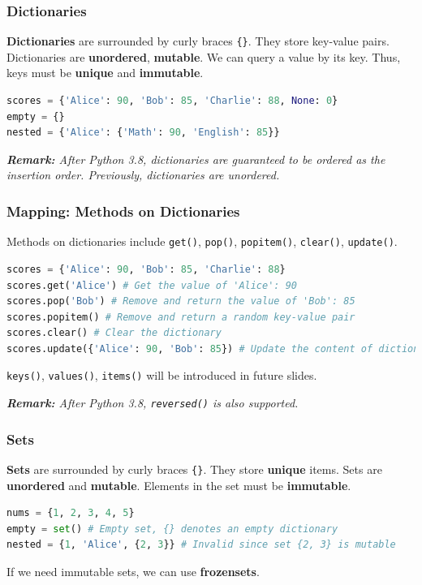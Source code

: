 \documentclass[beamer, en, version=2.0]{huangfusl-template}
\begin{document}
    \begin{frame}[fragile]
        \frametitle{Dictionaries}

        \textbf{Dictionaries} are surrounded by curly braces {\footnotesize\verb|{}|}. They store key-value pairs. Dictionaries are \textbf{unordered}, \textbf{mutable}. We can query a value by its key. Thus, keys must be \textbf{unique} and \textbf{immutable}.

\begin{lstlisting}[language=python]
scores = {'Alice': 90, 'Bob': 85, 'Charlie': 88, None: 0}
empty = {}
nested = {'Alice': {'Math': 90, 'English': 85}}
\end{lstlisting}

        {\footnotesize\itshape\textbf{Remark:} After Python 3.8, dictionaries are guaranteed to be ordered as the insertion order. Previously, dictionaries are unordered.}
    \end{frame}
    \begin{frame}[fragile]
        \frametitle{Mapping: Methods on Dictionaries}

        Methods on dictionaries include {\footnotesize\verb|get()|}, {\footnotesize\verb|pop()|}, {\footnotesize\verb|popitem()|}, {\footnotesize\verb|clear()|}, {\footnotesize\verb|update()|}.

\begin{lstlisting}[language=python]
scores = {'Alice': 90, 'Bob': 85, 'Charlie': 88}
scores.get('Alice') # Get the value of 'Alice': 90
scores.pop('Bob') # Remove and return the value of 'Bob': 85
scores.popitem() # Remove and return a random key-value pair
scores.clear() # Clear the dictionary
scores.update({'Alice': 90, 'Bob': 85}) # Update the content of dictionary
\end{lstlisting}

        {\footnotesize\verb|keys()|}, {\footnotesize\verb|values()|}, {\footnotesize\verb|items()|} will be introduced in future slides.

        {\footnotesize\itshape\textbf{Remark:} After Python 3.8, \verb|reversed()| is also supported.}
    \end{frame}
    \begin{frame}[fragile]
        \frametitle{Sets}

        \textbf{Sets} are surrounded by curly braces {\footnotesize\verb|{}|}. They store \textbf{unique} items. Sets are \textbf{unordered} and \textbf{mutable}. Elements in the set must be \textbf{immutable}.

\begin{lstlisting}[language=python]
nums = {1, 2, 3, 4, 5}
empty = set() # Empty set, {} denotes an empty dictionary
nested = {1, 'Alice', {2, 3}} # Invalid since set {2, 3} is mutable
\end{lstlisting}

        If we need immutable sets, we can use \textbf{frozensets}.
    \end{frame}
\end{document}
